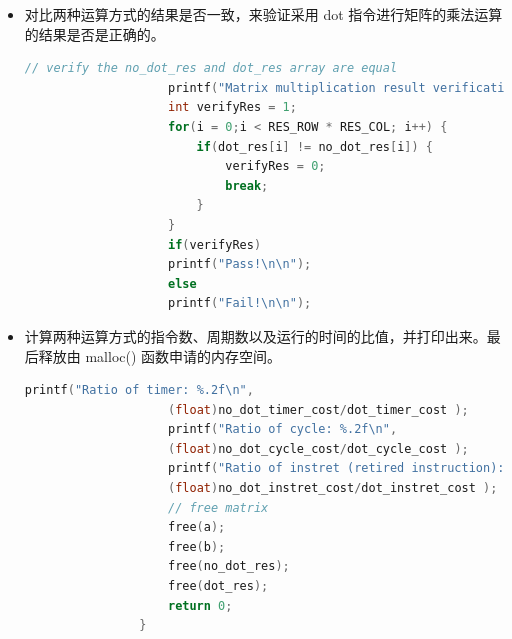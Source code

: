 \documentclass[a4paper, 14pt, oneside]{book} %
\numberwithin{equation}{subsection}
\begin{document}
\begin{itemize}
\begin{lstlisting}[language={C++}]
							asm volatile (
							"lw x10, %[a0]\t\n"
							"lw x11, %[a1]\t\n"
							"lw x12, %[a2]\t\n"
							"lw x13, %[a3]\t\n"
							"lw x14, %[a4]\t\n"
							"lw x15, %[a5]\t\n"
							"dot3 %[output], x12, x13\t\n"
							: [output]"=r"(reg)
							: [a0]"m"(a[i * A_COL + (k + 0)])
							,[a1]"m"(a[i * A_COL + (k + 1)])
							,[a2]"m"(a[i * A_COL + (k + 2)])
							,[a3]"m"(b[(k + 0) * B_COL + j])
							,[a4]"m"(b[(k + 1) * B_COL + j])
							,[a5]"m"(b[(k + 2) * B_COL + j])
							: "x10","x11","x12","x13"
							,"x14","x15"
							);
							
							dot_res[i * RES_COL + j] += reg;			   
						}
					}
					
					unsigned int dot_timer_cost   = get_timer_value() - dot_timer_start;
					unsigned int dot_cycle_cost   = get_cycle_value() - dot_cycle_start;
					unsigned int dot_instret_cost = get_instret_value() - dot_instret_start;
					
					printf("dot time cost: %.2fms\n", (float)dot_timer_cost/RTC_FREQ*1000);
					printf("dot_cycle: %u\n", dot_cycle_cost);
					printf("dot_instret: %u\n", dot_instret_cost);
					printf("dot CPI: %.2f\n\n", (float)dot_cycle_cost/dot_instret_cost);	
				\end{lstlisting}
				\item 对比两种运算方式的结果是否一致，来验证采用 dot 指令进行矩阵的乘法运算的结果是否是正确的。
				\begin{lstlisting}[language={C++}]
					// verify the no_dot_res and dot_res array are equal
					printf("Matrix multiplication result verification: \n");
					int verifyRes = 1;
					for(i = 0;i < RES_ROW * RES_COL; i++) {
						if(dot_res[i] != no_dot_res[i]) {
							verifyRes = 0;
							break;
						}
					}
					if(verifyRes)
					printf("Pass!\n\n");
					else
					printf("Fail!\n\n");	
				\end{lstlisting}
				\item 计算两种运算方式的指令数、周期数以及运行的时间的比值，并打印出来。最后释放由 malloc() 函数申请的内存空间。
				\begin{lstlisting}[language={C++}]
					printf("Ratio of timer: %.2f\n",
					(float)no_dot_timer_cost/dot_timer_cost );
					printf("Ratio of cycle: %.2f\n",
					(float)no_dot_cycle_cost/dot_cycle_cost );
					printf("Ratio of instret (retired instruction): %.2f\n",
					(float)no_dot_instret_cost/dot_instret_cost );	
					// free matrix
					free(a);
					free(b);
					free(no_dot_res);
					free(dot_res);
					return 0;
				}
			\end{lstlisting}
			
		\end{itemize}
\end{document}
